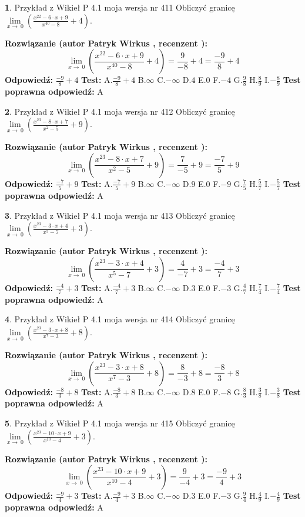\documentclass[12pt, a4paper]{article}
\theoremstyle{definition} %
\newtheorem{zad}{}
\newcommand{\zadStart}[1]{\begin{zad}#1\newline}
\newcommand{\zadStop}{\end{zad}}
\newcommand{\rozwStart}[2]{\noindent \textbf{Rozwiązanie (autor #1 , recenzent #2): }\newline}
\newcommand{\rozwStop}{\newline}
\newcommand{\odpStart}{\noindent \textbf{Odpowiedź:}\newline}
\newcommand{\odpStop}{\newline}
\newcommand{\testStart}{\noindent \textbf{Test:}\newline}
\newcommand{\testStop}{\newline}
\newcommand{\kluczStart}{\noindent \textbf{Test poprawna odpowiedź:}\newline}
\newcommand{\kluczStop}{\newline}
\begin{document}
\zadStart{Przykład z Wikieł P 4.1 moja wersja nr 411}
Obliczyć granicę $\lim\limits_{x\to\ 0}(\frac{x^{22}-6 \cdot x +9}{x^{40}-8}+4)$.
\zadStop
\rozwStart{Patryk Wirkus}{}
$$\lim\limits_{x\to\ 0}(\frac{x^{22}-6 \cdot x +9}{x^{40}-8}+4)=\frac{9}{-8}+4=\frac{-9}{8}+4$$
\rozwStop
\odpStart
$\frac{-9}{8}+4$
\odpStop
\testStart
A.$\frac{-9}{8}+4$
B.$\infty$
C.$-\infty$
D.$4$
E.$0$
F.$-4$
G.$\frac{9}{8}$
H.$\frac{8}{9}$
I.$-\frac{8}{9}$
\testStop
\kluczStart
A
\kluczStop



\zadStart{Przykład z Wikieł P 4.1 moja wersja nr 412}
Obliczyć granicę $\lim\limits_{x\to\ 0}(\frac{x^{23}-8 \cdot x +7}{x^{2}-5}+9)$.
\zadStop
\rozwStart{Patryk Wirkus}{}
$$\lim\limits_{x\to\ 0}(\frac{x^{23}-8 \cdot x +7}{x^{2}-5}+9)=\frac{7}{-5}+9=\frac{-7}{5}+9$$
\rozwStop
\odpStart
$\frac{-7}{5}+9$
\odpStop
\testStart
A.$\frac{-7}{5}+9$
B.$\infty$
C.$-\infty$
D.$9$
E.$0$
F.$-9$
G.$\frac{7}{5}$
H.$\frac{5}{7}$
I.$-\frac{5}{7}$
\testStop
\kluczStart
A
\kluczStop



\zadStart{Przykład z Wikieł P 4.1 moja wersja nr 413}
Obliczyć granicę $\lim\limits_{x\to\ 0}(\frac{x^{23}-3 \cdot x +4}{x^{5}-7}+3)$.
\zadStop
\rozwStart{Patryk Wirkus}{}
$$\lim\limits_{x\to\ 0}(\frac{x^{23}-3 \cdot x +4}{x^{5}-7}+3)=\frac{4}{-7}+3=\frac{-4}{7}+3$$
\rozwStop
\odpStart
$\frac{-4}{7}+3$
\odpStop
\testStart
A.$\frac{-4}{7}+3$
B.$\infty$
C.$-\infty$
D.$3$
E.$0$
F.$-3$
G.$\frac{4}{7}$
H.$\frac{7}{4}$
I.$-\frac{7}{4}$
\testStop
\kluczStart
A
\kluczStop



\zadStart{Przykład z Wikieł P 4.1 moja wersja nr 414}
Obliczyć granicę $\lim\limits_{x\to\ 0}(\frac{x^{23}-3 \cdot x +8}{x^{7}-3}+8)$.
\zadStop
\rozwStart{Patryk Wirkus}{}
$$\lim\limits_{x\to\ 0}(\frac{x^{23}-3 \cdot x +8}{x^{7}-3}+8)=\frac{8}{-3}+8=\frac{-8}{3}+8$$
\rozwStop
\odpStart
$\frac{-8}{3}+8$
\odpStop
\testStart
A.$\frac{-8}{3}+8$
B.$\infty$
C.$-\infty$
D.$8$
E.$0$
F.$-8$
G.$\frac{8}{3}$
H.$\frac{3}{8}$
I.$-\frac{3}{8}$
\testStop
\kluczStart
A
\kluczStop



\zadStart{Przykład z Wikieł P 4.1 moja wersja nr 415}
Obliczyć granicę $\lim\limits_{x\to\ 0}(\frac{x^{23}-10 \cdot x +9}{x^{10}-4}+3)$.
\zadStop
\rozwStart{Patryk Wirkus}{}
$$\lim\limits_{x\to\ 0}(\frac{x^{23}-10 \cdot x +9}{x^{10}-4}+3)=\frac{9}{-4}+3=\frac{-9}{4}+3$$
\rozwStop
\odpStart
$\frac{-9}{4}+3$
\odpStop
\testStart
A.$\frac{-9}{4}+3$
B.$\infty$
C.$-\infty$
D.$3$
E.$0$
F.$-3$
G.$\frac{9}{4}$
H.$\frac{4}{9}$
I.$-\frac{4}{9}$
\testStop
\kluczStart
A
\kluczStop
\end{document}
